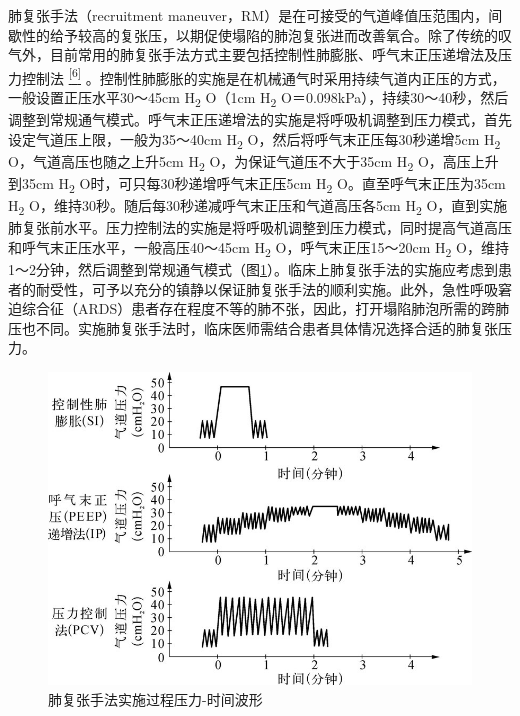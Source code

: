 肺复张手法（recruitment
maneuver，RM）是在可接受的气道峰值压范围内，间歇性的给予较高的复张压，以期促使塌陷的肺泡复张进而改善氧合。除了传统的叹气外，目前常用的肺复张手法方式主要包括控制性肺膨胀、呼气末正压递增法及压力控制法
\protect\hyperlink{text00011.htmlux5cux23ch6-10}{\textsuperscript{{[}6{]}}}
。控制性肺膨胀的实施是在机械通气时采用持续气道内正压的方式，一般设置正压水平30～45cm
H\textsubscript{2} O（1cm H\textsubscript{2}
O＝0.098kPa），持续30～40秒，然后调整到常规通气模式。呼气末正压递增法的实施是将呼吸机调整到压力模式，首先设定气道压上限，一般为35～40cm
H\textsubscript{2} O，然后将呼气末正压每30秒递增5cm H\textsubscript{2}
O，气道高压也随之上升5cm H\textsubscript{2} O，为保证气道压不大于35cm
H\textsubscript{2} O，高压上升到35cm H\textsubscript{2}
O时，可只每30秒递增呼气末正压5cm H\textsubscript{2}
O。直至呼气末正压为35cm H\textsubscript{2}
O，维持30秒。随后每30秒递减呼气末正压和气道高压各5cm H\textsubscript{2}
O，直到实施肺复张前水平。压力控制法的实施是将呼吸机调整到压力模式，同时提高气道高压和呼气末正压水平，一般高压40～45cm
H\textsubscript{2} O，呼气末正压15～20cm H\textsubscript{2}
O，维持1～2分钟，然后调整到常规通气模式（图\ref{fig5-1}）。临床上肺复张手法的实施应考虑到患者的耐受性，可予以充分的镇静以保证肺复张手法的顺利实施。此外，急性呼吸窘迫综合征（ARDS）患者存在程度不等的肺不张，因此，打开塌陷肺泡所需的跨肺压也不同。实施肺复张手法时，临床医师需结合患者具体情况选择合适的肺复张压力。

\begin{figure}[!htbp]
 \centering
 \includegraphics{./images/Image00050.jpg}
 \captionsetup{justification=centering}
 \caption{肺复张手法实施过程压力-时间波形}
 \label{fig5-1}
  \end{figure} 

